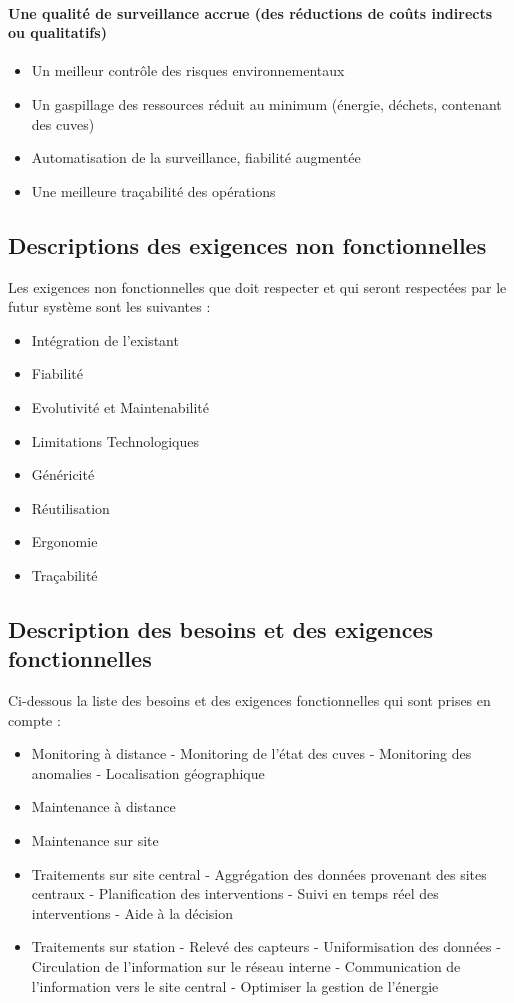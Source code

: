 \documentclass[a4paper]{article}
\begin{document}
\paragraph{Une qualité de surveillance accrue (des réductions de coûts indirects ou qualitatifs)}

\begin{itemize}
\item Un meilleur contrôle des risques environnementaux
\item Un gaspillage des ressources réduit au minimum (énergie, déchets, contenant des cuves)
\item Automatisation de la surveillance, fiabilité augmentée
\item Une meilleure traçabilité des opérations
\end{itemize}

\subsection{Descriptions des exigences non fonctionnelles}

Les exigences non fonctionnelles que doit respecter et qui seront respectées par le futur système sont les suivantes :

\begin{itemize}
\item Intégration de l'existant
\item Fiabilité
\item Evolutivité et Maintenabilité
\item Limitations Technologiques
\item Généricité
\item Réutilisation
\item Ergonomie
\item Traçabilité
\end{itemize}

\subsection{Description des besoins et des exigences fonctionnelles}

Ci-dessous la liste des besoins et des exigences fonctionnelles qui sont prises en compte :

\begin{itemize}
\item Monitoring à distance - Monitoring de l'état des cuves - Monitoring des anomalies - Localisation géographique
\item Maintenance à distance
\item Maintenance sur site
\item Traitements sur site central - Aggrégation des données provenant des sites centraux - Planification des interventions - Suivi en temps réel des interventions - Aide à la décision
\item Traitements sur station - Relevé des capteurs - Uniformisation des données - Circulation de l'information sur le réseau interne - Communication de l'information vers le site central - Optimiser la gestion de l'énergie
\end{itemize}
\end{document}
